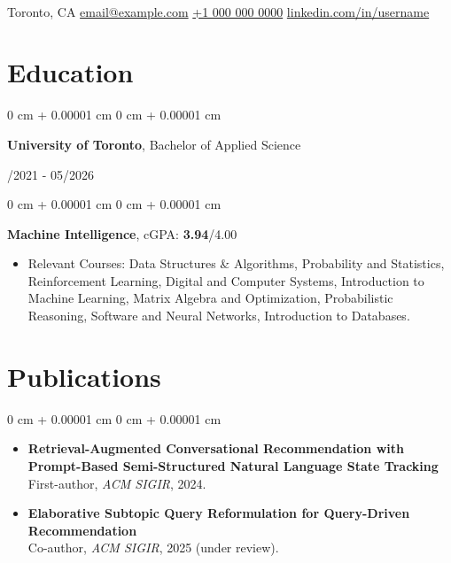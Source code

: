 \documentclass[11pt, letterpaper]{article}
\makeatletter
\newenvironment{highlights}{
    \begin{itemize}[
        topsep=0.08 cm,
        parsep=0.08 cm,
        partopsep=0pt,
        itemsep=0pt,
        leftmargin=0.2 cm + 17pt
    ]
}
{
    \end{itemize}
}
\newenvironment{onecolentry}{
    \begin{adjustwidth}{
        0 cm + 0.00001 cm
    }{
        0 cm + 0.00001 cm
    }
}{
    \end{adjustwidth}
}
\newenvironment{twocolentry}[2][]{
    \onecolentry
    \def\secondColumn{#2}
    \setcolumnwidth{\fill, 4.5 cm}
    \begin{paracol}{2}
}{
    \switchcolumn \raggedleft \secondColumn
    \end{paracol}
    \endonecolentry
}
\newcommand{\contactinfo}{
    \centering
    {\fontsize{25pt}{25pt}\selectfont } \\[4pt]
    \vspace{0.3cm}
     Toronto, CA \hfill 
    \href{mailto:email@example.com}{email@example.com} \hfill 
    \href{tel:+1-000-000-0000}{+1 000 000 0000} \hfill 
    \href{https://www.linkedin.com/in/username}{linkedin.com/in/username} \\
}
\makeatother
\begin{document}
\contactinfo
\vspace{2pt}

\section{Education}
\vspace{0.08 cm}
\begin{twocolentry}{09/2021 - 05/2026}
    {\textbf{University of Toronto}}, Bachelor of Applied Science
\end{twocolentry}
\vspace{0.11cm}
\begin{onecolentry}
\hspace{0.3cm}\textbf{Machine Intelligence},  cGPA: {\textbf{3.94}}/4.00
\vspace{0.07cm}
    \begin{highlights}
        \item Relevant Courses: Data Structures \& Algorithms, Probability and Statistics, Reinforcement Learning, Digital and Computer Systems, Introduction to Machine Learning, Matrix Algebra and Optimization, Probabilistic Reasoning, Software and Neural Networks, Introduction to Databases.
    \end{highlights}
\end{onecolentry}

\section{Publications}
\vspace{0.08 cm}
\begin{onecolentry}
    \begin{highlights}
    \item \textbf{Retrieval-Augmented Conversational Recommendation with Prompt-Based Semi-Structured Natural Language State Tracking} \\
    First-author, \textit{ACM SIGIR}, 2024. 
    \vspace{0.1cm}
    \item \textbf{Elaborative Subtopic Query Reformulation for Query-Driven Recommendation} \\
    Co-author, \textit{ACM SIGIR}, 2025 (under review).
    \end{highlights}
\end{onecolentry}
\end{document}
